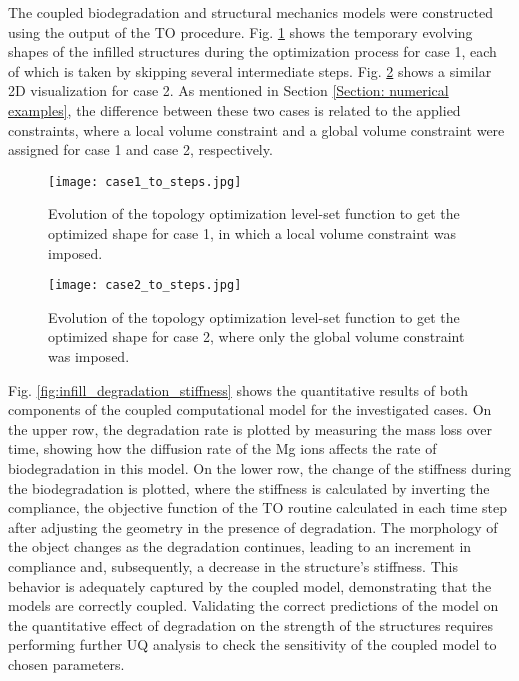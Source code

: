 The coupled biodegradation and structural mechanics models were constructed using the output of the \gls{TO} procedure. Fig. \ref{fig:infill_case1_to_steps} shows the temporary evolving shapes of the infilled structures during the optimization process for case 1, each of which is taken by skipping several intermediate steps. Fig. \ref{fig:infill_case2_to_steps} shows a similar 2D visualization for case 2. As mentioned in Section \ref{Section: numerical examples}, the difference between these two cases is related to the applied constraints, where a local volume constraint and a global volume constraint were assigned for case 1 and case 2, respectively.


\begin{figure}[h]
\centering
\medskip
\texttt{[image: case1\_to\_steps.jpg]}
\caption[Evolution of the topology optimization level-set function for case 1]{Evolution of the topology optimization level-set function to get the optimized shape for case 1, in which a local volume constraint was imposed.} \label{fig:infill_case1_to_steps}
\end{figure}

\begin{figure}[h]
\centering
\medskip
\texttt{[image: case2\_to\_steps.jpg]}
\caption[Evolution of the topology optimization level-set function for case 2]{Evolution of the topology optimization level-set function to get the optimized shape for case 2, where only the global volume constraint was imposed.} \label{fig:infill_case2_to_steps}
\end{figure}

Fig. \ref{fig:infill_degradation_stiffness} shows the quantitative results of both components of the coupled computational model for the investigated cases. On the upper row, the degradation rate is plotted by measuring the mass loss over time, showing how the diffusion rate of the Mg ions affects the rate of biodegradation in this model. On the lower row, the change of the stiffness during the biodegradation is plotted, where the stiffness is calculated by inverting the compliance, the objective function of the \gls{TO} routine calculated in each time step after adjusting the geometry in the presence of degradation. The morphology of the object changes as the degradation continues, leading to an increment in compliance and, subsequently, a decrease in the structure's stiffness. This behavior is adequately captured by the coupled model, demonstrating that the models are correctly coupled. Validating the correct predictions of the model on the quantitative effect of degradation on the strength of the structures requires performing further \gls{UQ} analysis to check the sensitivity of the coupled model to chosen parameters.

